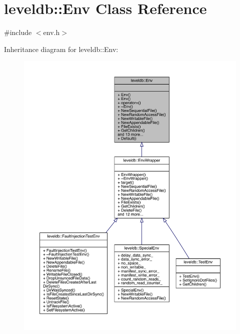 \hypertarget{classleveldb_1_1_env}{}\section{leveldb\+::Env Class Reference}
\label{classleveldb_1_1_env}


{\ttfamily \#include $<$env.\+h$>$}



Inheritance diagram for leveldb\+::Env\+:
\nopagebreak
\begin{figure}[H]
\begin{center}
\leavevmode
\includegraphics[width=350pt]{classleveldb_1_1_env__inherit__graph}
\end{center}
\end{figure}


